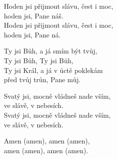 
\ve{}
Hoden jsi přijmout slávu, čest i moc, \\
hoden jsi, Pane náš. \\
Hoden jsi přijmout slávu, čest i moc, \\
hoden jsi, Pane ná.

\cho{}
Ty jsi Bůh, a já smím být tvůj, \\
Ty jsi Bůh, Ty jsi Bůh, \\
Ty jsi Král, a já v úctě poklekám \\
před tvůj trůn, Pane můj.

\ve{}
Svatý jsi, mocně vládneš nade vším, \\
ve slávě, v nebesích. \\
Svatý jsi, mocně vládneš nade vším, \\
ve slávě, v nebesích.

\cho{}

Amen (amen), amen (amen), \\
amen (amen), amen (amen).

\cho{}

\esong